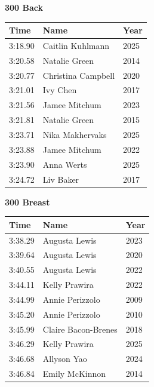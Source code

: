 \vspace{1.2em}
\noindent\begin{minipage}[t]{0.48\textwidth}
\centering
\textbf{\textcolor{teamprimary}{300 Back}}\par
\vspace{0.5em}
\centering
\small
\renewcommand{\arraystretch}{1.0}
\setlength{\tabcolsep}{4pt}
\begin{tabular}{@{}p{1.8cm}p{3.0cm}p{1.0cm}@{}}
\toprule
\textbf{Time} & \textbf{Name} & \textbf{Year} \\
\midrule
3:18.90 & Caitlin Kuhlmann & 2025 \\
3:20.58 & Natalie Green & 2014 \\
3:20.77 & Christina Campbell & 2020 \\
3:21.01 & Ivy Chen & 2017 \\
3:21.56 & Jamee Mitchum & 2023 \\
3:21.81 & Natalie Green & 2015 \\
3:23.71 & Nika Makhervaks & 2025 \\
3:23.88 & Jamee Mitchum & 2022 \\
3:23.90 & Anna Werts & 2025 \\
3:24.72 & Liv Baker & 2017 \\
\bottomrule
\end{tabular}
\end{minipage}
\hfill
\begin{minipage}[t]{0.48\textwidth}
\centering
\textbf{\textcolor{teamprimary}{300 Breast}}\par
\vspace{0.5em}
\centering
\small
\renewcommand{\arraystretch}{1.0}
\setlength{\tabcolsep}{4pt}
\begin{tabular}{@{}p{1.8cm}p{3.0cm}p{1.0cm}@{}}
\toprule
\textbf{Time} & \textbf{Name} & \textbf{Year} \\
\midrule
3:38.29 & Augusta Lewis & 2023 \\
3:39.64 & Augusta Lewis & 2020 \\
3:40.55 & Augusta Lewis & 2022 \\
3:44.11 & Kelly Prawira & 2022 \\
3:44.99 & Annie Perizzolo & 2009 \\
3:45.20 & Annie Perizzolo & 2010 \\
3:45.99 & Claire Bacon-Brenes & 2018 \\
3:46.29 & Kelly Prawira & 2025 \\
3:46.68 & Allyson Yao & 2024 \\
3:46.84 & Emily McKinnon & 2014 \\
\bottomrule
\end{tabular}
\end{minipage}
